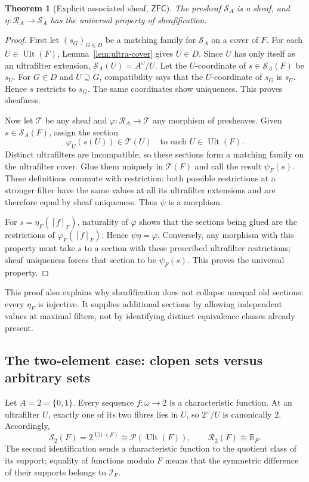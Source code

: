 \documentclass[11pt,letterpaper]{article}
\newtheorem{theorem}{Theorem}[section]
\theoremstyle{definition}
\theoremstyle{remark}
\newcommand{\om}{\omega}
\newcommand{\RA}{\mathscr R_A}
\newcommand{\SA}{\mathscr S_A}
\newcommand{\Pow}{\mathcal P}
\newcommand{\Ult}{\operatorname{Ult}}
\newcommand{\ZFC}{\mathsf{ZFC}}
\newcommand{\B}{\mathbb B}
\newcommand{\I}{\mathcal I}
\begin{document}
\begin{theorem}[Explicit associated sheaf, $\ZFC$]\label{thm:sheafification}
The presheaf $\SA$ is a sheaf, and $\eta:\RA\to\SA$ has the
universal property of sheafification.
\end{theorem}
\begin{proof}
First let $(s_G)_{G\in D}$ be a matching family for $\SA$ on a cover
of $F$. For each $U\in\Ult(F)$, Lemma~\ref{lem:ultra-cover} gives
$U\in D$. Since $U$ has only itself as an ultrafilter extension,
$\SA(U)=A^\om/U$. Let the $U$-coordinate of $s\in\SA(F)$ be
$s_U$. For $G\in D$ and $U\supseteq G$, compatibility says that
the $U$-coordinate of $s_G$ is $s_U$. Hence $s$ restricts to $s_G$.
The same coordinates show uniqueness. This proves sheafness.

Now let $\mathscr T$ be any sheaf and
$\varphi:\RA\to\mathscr T$ any morphism of presheaves. Given
$s\in\SA(F)$, assign the section
\[
 \varphi_U(s(U))\in\mathscr T(U)
 \quad\text{to each }U\in\Ult(F).
\]
Distinct ultrafilters are incompatible, so these sections form a
matching family on the ultrafilter cover. Glue them uniquely in
$\mathscr T(F)$ and call the result $\psi_F(s)$. These definitions
commute with restriction: both possible restrictions at a stronger
filter have the same values at all its ultrafilter extensions and are
therefore equal by sheaf uniqueness. Thus $\psi$ is a morphism.

For $s=\eta_F([f]_F)$, naturality of $\varphi$ shows that the
sections being glued are the restrictions of $\varphi_F([f]_F)$.
Hence $\psi\eta=\varphi$. Conversely, any morphism with this
property must take $s$ to a section with these prescribed ultrafilter
restrictions; sheaf uniqueness forces that section to be $\psi_F(s)$.
This proves the universal property.
\end{proof}

This proof also explains why sheafification does not collapse unequal
old sections: every $\eta_F$ is injective. It supplies additional
sections by allowing independent values at maximal filters, not by
identifying distinct equivalence classes already present.

\subsection{The two-element case: clopen sets versus arbitrary sets}
Let $A=2=\{0,1\}$. Every sequence $f:\om\to2$ is a characteristic
function. At an ultrafilter $U$, exactly one of its two fibres lies in
$U$, so $2^\om/U$ is canonically $2$. Accordingly,
\begin{equation}\label{eq:binary-product}
 \mathscr S_2(F)=2^{\Ult(F)}\cong\Pow(\Ult(F)),
 \qquad \mathscr R_2(F)\cong\B_F.
\end{equation}
The second identification sends a characteristic function to the
quotient class of its support; equality of functions modulo $F$ means
that the symmetric difference of their supports belongs to $\I_F$.
\end{document}
